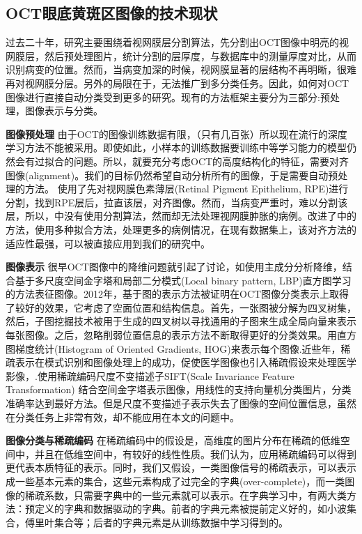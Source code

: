     \subsection{OCT眼底黄斑区图像的技术现状}
    过去二十年，研究主要围绕着视网膜层分割算法\cite{antony2013combined,savastano2014differential}，先分割出OCT图像中明亮的视网膜层，然后预处理图片，统计分割的层厚度，与数据库中的测量厚度对比，从而识别病变的位置。然而，当病变加深的时候，视网膜显著的层结构不再明晰，很难再对视网膜分层。另外的局限在于，无法推广到多分类任务。因此，如何对OCT图像进行直接自动分类受到更多的研究。现有的方法框架主要分为三部分:预处理，图像表示与分类。

    \textbf{图像预处理}
    由于OCT的图像训练数据有限，（只有几百张）所以现在流行的深度学习方法不能被采用。即使如此，小样本的训练数据要训练中等学习能力的模型仍然会有过拟合的问题。所以，就要充分考虑OCT的高度结构化的特征，需要对齐图像(alignment)。我们的目标仍然希望自动分析所有的图像，于是需要自动预处理的方法。 使用了先对视网膜色素薄层(Retinal Pigment Epithelium, RPE)进行分割，找到RPE层后，拉直该层，对齐图像。然而，当病变严重时，难以分割该层，所以，中没有使用分割算法，然而却无法处理视网膜肿胀的病例。改进了中的方法，使用多种拟合方法，处理更多的病例情况，在现有数据集上，该对齐方法的适应性最强，可以被直接应用到我们的研究中。

    \textbf{图像表示}
    很早OCT图像中的降维问题就引起了讨论，如使用主成分分析降维，结合基于多尺度空间金字塔和局部二分模式(Local binary pattern, LBP)直方图学习的方法表征图像。2012年，基于图的表示方法被证明在OCT图像分类表示上取得了较好的效果\cite{zheng2012automated,hijazi2012data}，它考虑了空面位置和结构信息。首先，一张图被分解为四叉树集，然后，子图挖掘技术被用于生成的四叉树以寻找通用的子图来生成全局向量来表示每张图像。之后，忽略削弱位置信息的表示方法不断取得更好的分类效果\cite{srinivasan2014fully}。用直方图梯度统计(Histogram of Oriented Gradients, HOG)来表示每个图像.近些年，稀疏表示在模式识别和图像处理上的成功，促使医学图像也引入稀疏假设来处理医学影像，\cite{oliveira2014medical,wang2015predict,afzali2016medical}.使用稀疏编码尺度不变描述子SIFT(Scale Invariance Feature Transformation) 结合空间金字塔表示图像，用线性的支持向量机分类图片，分类准确率达到最好方法。但是尺度不变描述子表示失去了图像的空间位置信息，虽然在分类任务上非常有效，却不能应用在本文的问题中。

    \textbf{图像分类与稀疏编码}
    在稀疏编码中的假设是，高维度的图片分布在稀疏的低维空间中，并且在低维空间中，有较好的线性性质。我们认为，应用稀疏编码可以得到更代表本质特征的表示。同时，我们又假设，一类图像信号的稀疏表示，可以表示成一些基本元素的集合，这些元素构成了过完全的字典(over-complete)，而一类图像的稀疏系数，只需要字典中的一些元素就可以表示。在字典学习中，有两大类方法：预定义的字典和数据驱动的字典。前者的字典元素被提前定义好的，如小波集合，傅里叶集合等；后者的字典元素是从训练数据中学习得到的。

